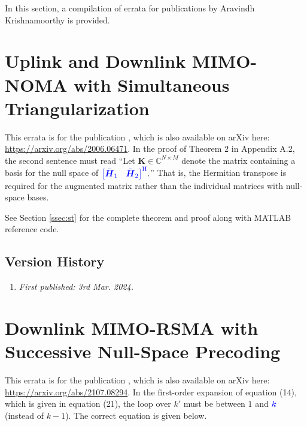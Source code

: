 In this section, a compilation of errata for publications by Aravindh Krishnamoorthy is provided.

\section{Uplink and Downlink MIMO-NOMA with Simultaneous Triangularization}
This errata is for the publication \cite{Krishnamoorthy2021}, which is also available on arXiv here: \url{https://arxiv.org/abs/2006.06471}. In the proof of Theorem $2$ in Appendix A.2, the second sentence must read ``Let $\boldsymbol{K} \in \mathbb{C}^{N\times M}$ denote the matrix containing a basis for the null space of $\textcolor{blue}{\begin{bmatrix} \bar{\boldsymbol{H}}_1 & \bar{\boldsymbol{H}}_2\end{bmatrix}^\mathrm{H}}.$'' That is, the Hermitian transpose is required for the augmented matrix rather than the individual matrices with null-space bases.

See Section \ref{ssec:st} for the complete theorem and proof along with MATLAB reference code.

\subsection{Version History}
\begin{enumerate}
	\item \emph{First published: 3rd Mar. 2024.}
\end{enumerate}

\section{Downlink MIMO-RSMA with Successive Null-Space Precoding}

This errata is for the publication \cite{Krishnamoorthy2022}, which is also available on arXiv here: \url{https://arxiv.org/abs/2107.08294}. In the first-order expansion of equation (14), which is given in equation (21), the loop over $k'$ must be between $1$ and $\textcolor{blue}{k}$ (instead of $k-1$). The correct equation is given below.

